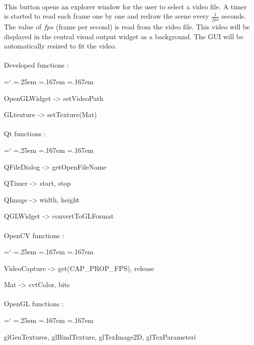 \documentclass[12pt]{report}
\DeclareRobustCommand*{\ttfamily}{
  \origttfamily
  \hyphenchar\font=`\-\relax
  \fontdimen3\font=.25em\relax
  \fontdimen4\font=.167em\relax
  \fontdimen7\font=.167em\relax
}
\newenvironment{code}{\ttfamily}{}
\begin{document}
\paragraph{}
	This button opens an explorer window for the user to select a video file. A timer is started to read each frame one by one and redraw the scene every $\frac{1}{fps}$ seconds. The value of $fps$ (frame per second) is read from the video file. This video will be displayed in the central visual output widget as a background. The GUI will be automatically resized to fit the video.

\paragraph{}
	Developed functions :

	\begin{code}
	OpenGLWidget -> setVideoPath

	GLtexture -> setTexture(Mat)
	\end{code}

\paragraph{}
	Qt functions :

	\begin{code}
	QFileDialog -> getOpenFileName

	QTimer -> start, stop

	QImage -> width, height

	QGLWidget -> convertToGLFormat
	\end{code}

\paragraph{}
	OpenCV functions :

	\begin{code}
	VideoCapture -> get(CAP\_PROP\_FPS), release

	Mat -> cvtColor, bits
	\end{code}

\paragraph{}
	OpenGL functions :

	\begin{code}
	glGenTextures, glBindTexture, glTexImage2D, glTexParameteri
	\end{code}
\end{document}
